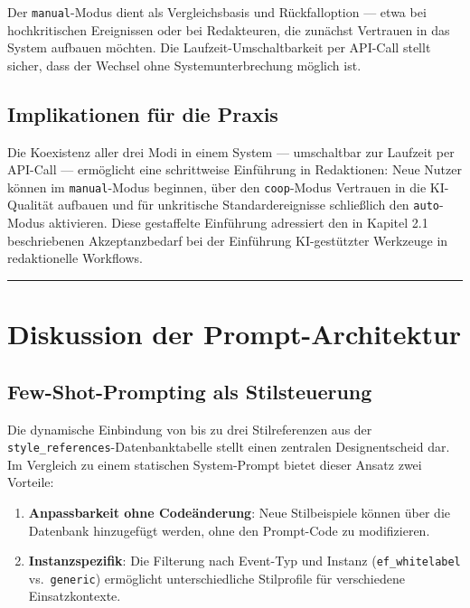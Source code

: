Der \texttt{manual}-Modus dient als Vergleichsbasis und Rückfalloption
--- etwa bei hochkritischen Ereignissen oder bei Redakteuren, die
zunächst Vertrauen in das System aufbauen möchten. Die
Laufzeit-Umschaltbarkeit per API-Call stellt sicher, dass der Wechsel
ohne Systemunterbrechung möglich ist.

\subsection{Implikationen für die
Praxis}\label{implikationen-fuxfcr-die-praxis}

Die Koexistenz aller drei Modi in einem System --- umschaltbar zur
Laufzeit per API-Call --- ermöglicht eine schrittweise Einführung in
Redaktionen: Neue Nutzer können im \texttt{manual}-Modus beginnen, über
den \texttt{coop}-Modus Vertrauen in die KI-Qualität aufbauen und für
unkritische Standardereignisse schließlich den \texttt{auto}-Modus
aktivieren. Diese gestaffelte Einführung adressiert den in Kapitel 2.1
beschriebenen Akzeptanzbedarf bei der Einführung KI-gestützter Werkzeuge
in redaktionelle Workflows.

\begin{center}\rule{0.5\linewidth}{0.5pt}\end{center}

\section{Diskussion der
Prompt-Architektur}\label{diskussion-der-prompt-architektur}

\subsection{Few-Shot-Prompting als
Stilsteuerung}\label{few-shot-prompting-als-stilsteuerung}

Die dynamische Einbindung von bis zu drei Stilreferenzen aus der
\texttt{style\_references}-Datenbanktabelle stellt einen zentralen
Designentscheid dar. Im Vergleich zu einem statischen System-Prompt
bietet dieser Ansatz zwei Vorteile:

\begin{enumerate}
\def\labelenumi{\arabic{enumi}.}
\tightlist
\item
  \textbf{Anpassbarkeit ohne Codeänderung}: Neue Stilbeispiele können
  über die Datenbank hinzugefügt werden, ohne den Prompt-Code zu
  modifizieren.
\item
  \textbf{Instanzspezifik}: Die Filterung nach Event-Typ und Instanz
  (\texttt{ef\_whitelabel} vs.~\texttt{generic}) ermöglicht
  unterschiedliche Stilprofile für verschiedene Einsatzkontexte.
\end{enumerate}

